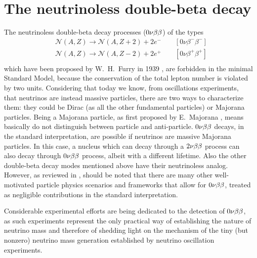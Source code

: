 \section*{The neutrinoless double-beta decay}
	The neutrinoless double-beta decay processes ($0\nu\beta\beta$) of the types
\begin{equation*}
	\begin{split}
		& \mathcal{N}(A,Z)\longrightarrow \mathcal{N}(A,Z+2)+2e^- \qquad [0\nu\beta^-\beta^-] \\
		& \mathcal{N}(A,Z)\longrightarrow \mathcal{N}(A,Z-2)+2e^+ \qquad [0\nu\beta^+\beta^+] \\
	\end{split}
\end{equation*}
which have been proposed by W.~H.~Furry in 1939 \cite{PhysRev.56.1184}, are forbidden in the minimal Standard Model, because the conservation of the total lepton number is violated by two units. Considering that today we know, from oscillations experiments, that neutrinos are instead massive particles, there are two ways to characterize them: they could be Dirac (as all the other fundamental particles) or Majorana particles. Being a Majorana particle, as first proposed by E.~Majorana \cite{Majorana1932}, means basically do not distinguish between particle and anti-particle. $0\nu\beta\beta$ decays, in the standard interpretation, are possible if neutrinos are massive Majorana particles. In this case, a nucleus which can decay through a $2\nu\beta\beta$ process can also decay through $0\nu\beta\beta$ process, albeit with a different lifetime. Also the other double-beta decay modes mentioned above have their neutrinoless analog. However, as reviewed in \cite{Rodejohann:2011mu}, should be noted that there are many other well-motivated particle physics scenarios and frameworks that allow for $0\nu\beta\beta$, treated as negligible contributions in the standard interpretation.

	Considerable experimental efforts are being dedicated to the detection of $0\nu\beta\beta$, as such experiments represent the only practical way of establishing the nature of neutrino mass and therefore of shedding light on the mechanism of the tiny (but nonzero) neutrino mass generation established by neutrino oscillation experiments.

